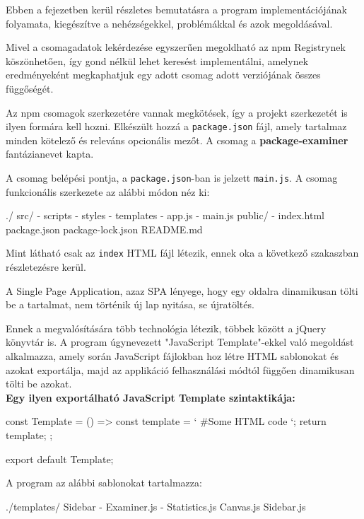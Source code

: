 
Ebben a fejezetben kerül részletes bemutatásra a program implementációjának folyamata, kiegészítve a nehézségekkel, problémákkal és azok megoldásával. 

Mivel a csomagadatok lekérdezése egyszerűen megoldható az npm Registrynek köszönhetően, így gond nélkül lehet keresést implementálni, amelynek eredményeként megkaphatjuk egy adott csomag adott verziójának összes függőségét.

Az npm csomagok szerkezetére vannak megkötések, így a projekt szerkezetét is ilyen formára kell hozni. Elkészült hozzá a \texttt{package.json} fájl, amely tartalmaz minden kötelező és releváns opcionális mezőt. A csomag a \textbf{package-examiner} fantázianevet kapta.   

A csomag belépési pontja, a \texttt{package.json}-ban is jelzett \texttt{main.js}. A csomag funkcionális szerkezete az alábbi módon néz ki:

\begin{js}
./	
	src/
		- scripts
		- styles
		- templates
		- app.js
		- main.js
	public/
		- index.html
	package.json
	package-lock.json
	README.md	
\end{js}

Mint látható csak az \texttt{index} HTML fájl létezik, ennek oka a következő szakaszban részletezésre kerül.

\pagebreak


A Single Page Application, azaz SPA lényege, hogy egy oldalra dinamikusan tölti be a tartalmat, nem történik új lap nyitása, se újratöltés.

Ennek a megvalósítására több technológia létezik, többek között a jQuery könyvtár is. A program úgynevezett "JavaScript Template"-ekkel való megoldást alkalmazza, amely során JavaScript fájlokban hoz létre HTML sablonokat és azokat exportálja, majd az applikáció felhasználási módtól függően dinamikusan tölti be azokat.\\

\textbf{Egy ilyen exportálható JavaScript Template szintaktikája:}

\begin{js}
	const Template = () => {
		const template = `
		#Some HTML code
		`;
		return template;
	};

	export default Template;
\end{js}

A program az alábbi sablonokat tartalmazza:
\begin{js}
./templates/	
	Sidebar
	- Examiner.js
	- Statistics.js
	Canvas.js
	Sidebar.js
\end{js}

